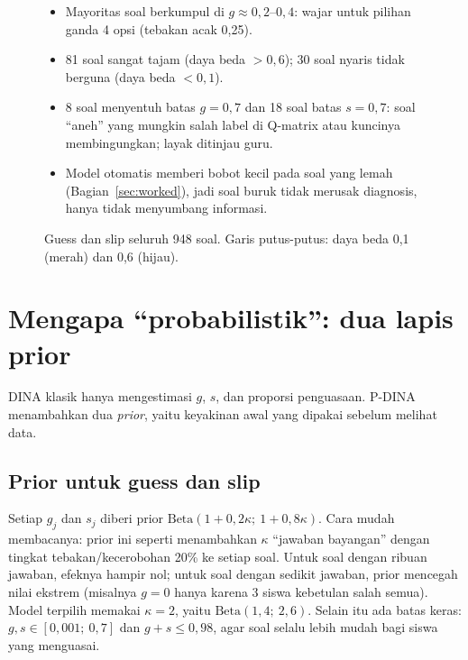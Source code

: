 \documentclass[11pt,a4paper]{article}
\begin{document}
\begin{figure}[h]
  \centering
  \setlength\figH{6.2cm}
  \begin{minipage}[c]{0.52\linewidth}\end{minipage}\hfill
  \begin{minipage}[c]{0.44\linewidth}\small
    \begin{itemize}
      \item Mayoritas soal berkumpul di $g\approx0{,}2$--$0{,}4$: wajar untuk pilihan ganda 4 opsi (tebakan acak 0,25).
      \item 81 soal sangat tajam (daya beda $>0{,}6$); 30 soal nyaris tidak berguna (daya beda $<0{,}1$).
      \item 8 soal menyentuh batas $g=0{,}7$ dan 18 soal batas $s=0{,}7$: soal ``aneh'' yang mungkin salah label di
            Q-matrix atau kuncinya membingungkan; layak ditinjau guru.
      \item Model otomatis memberi bobot kecil pada soal yang lemah (Bagian~\ref{sec:worked}), jadi soal buruk tidak
            merusak diagnosis, hanya tidak menyumbang informasi.
    \end{itemize}
  \end{minipage}
  \caption{Guess dan slip seluruh 948 soal. Garis putus-putus: daya beda 0,1 (merah) dan 0,6 (hijau).}
  \label{fig:gs}
\end{figure}

\section{Mengapa ``probabilistik'': dua lapis prior}

DINA klasik hanya mengestimasi $g$, $s$, dan proporsi penguasaan. P-DINA menambahkan dua \emph{prior}, yaitu
keyakinan awal yang dipakai sebelum melihat data.

\subsection{Prior untuk guess dan slip}

Setiap $g_j$ dan $s_j$ diberi prior $\mathrm{Beta}(1+0{,}2\kappa;\ 1+0{,}8\kappa)$. Cara mudah membacanya: prior ini
seperti menambahkan $\kappa$ ``jawaban bayangan'' dengan tingkat tebakan/kecerobohan 20\% ke setiap soal. Untuk soal
dengan ribuan jawaban, efeknya hampir nol; untuk soal dengan sedikit jawaban, prior mencegah nilai ekstrem (misalnya
$g=0$ hanya karena 3 siswa kebetulan salah semua). Model terpilih memakai $\kappa=2$, yaitu $\mathrm{Beta}(1{,}4;\
2{,}6)$. Selain itu ada batas keras: $g,s\in[0{,}001;\ 0{,}7]$ dan $g+s\le0{,}98$, agar soal selalu lebih mudah bagi
siswa yang menguasai.
\end{document}
